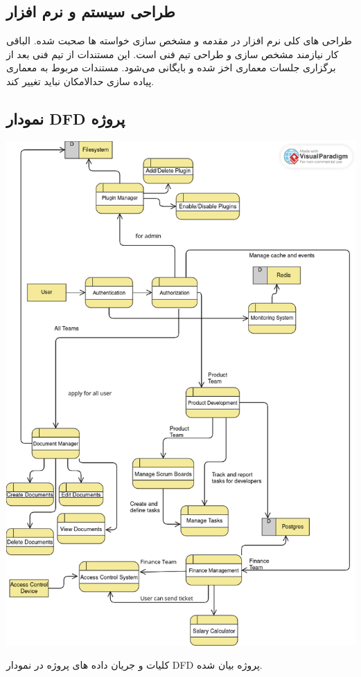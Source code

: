 \subsection{طراحی سیستم و نرم افزار}
طراحی های کلی نرم افزار در مقدمه و مشخص سازی خواسته ها صحبت شده. الباقی کار نیازمند مشخص سازی و طراحی تیم فنی است. این مستندات از تیم فنی بعد از 
برگزاری جلسات معماری اخز شده و بایگانی می‌شود.
مستندات مربوط به معماری پیاده سازی حدالامکان نباید تغییر کند.

\subsection{نمودار DFD پروژه}

\includegraphics[scale=0.55]{assets/main_dfd.png}

کلیات و جریان داده های پروژه در نمودار DFD پروژه بیان شده.